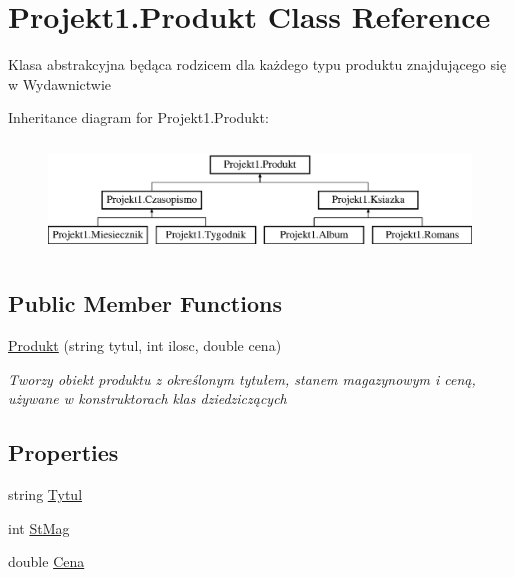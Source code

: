 \hypertarget{class_projekt1_1_1_produkt}{}\section{Projekt1.\+Produkt Class Reference}
\label{class_projekt1_1_1_produkt}


Klasa abstrakcyjna będąca rodzicem dla każdego typu produktu znajdującego się w Wydawnictwie  


Inheritance diagram for Projekt1.\+Produkt\+:\begin{figure}[H]
\begin{center}
\leavevmode
\includegraphics[height=3.000000cm]{class_projekt1_1_1_produkt}
\end{center}
\end{figure}
\subsection*{Public Member Functions}
\begin{DoxyCompactItemize}
\item 
\mbox{\hyperlink{class_projekt1_1_1_produkt_a91c3b210c6984e3576499c32c17ba348}{Produkt}} (string tytul, int ilosc, double cena)
\begin{DoxyCompactList}\small\item\em Tworzy obiekt produktu z określonym tytułem, stanem magazynowym i ceną, używane w konstruktorach klas dziedziczących \end{DoxyCompactList}\end{DoxyCompactItemize}
\subsection*{Properties}
\begin{DoxyCompactItemize}
\item 
string \mbox{\hyperlink{class_projekt1_1_1_produkt_a6c62f201bf5ab96f43cd8be7a7ae64ab}{Tytul}}
\item 
int \mbox{\hyperlink{class_projekt1_1_1_produkt_aee1619c7a5300a856be453b5defe11ec}{St\+Mag}}
\item 
double \mbox{\hyperlink{class_projekt1_1_1_produkt_a3c7dbe39c5e5080264cdf6e5f7fa4031}{Cena}}
\end{DoxyCompactItemize}


